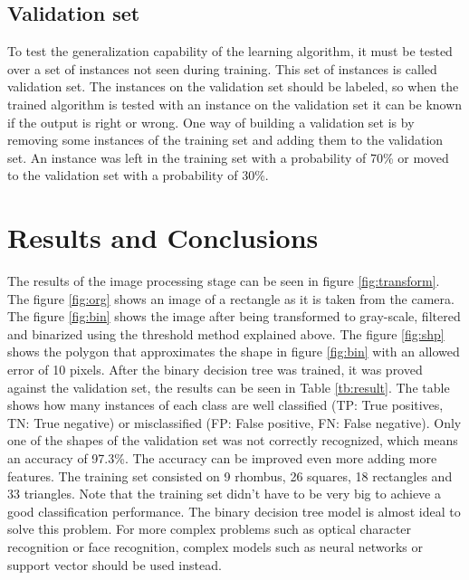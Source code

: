 \documentclass[10pt,journal]{IEEEtran}
\begin{document}
	\subsection{Validation set}
	To test the generalization capability of the learning algorithm, it must be
	tested over a set of instances not seen during training. This set of instances is
	called validation set. The instances on the validation set should be labeled, so when
	the trained algorithm is tested with an instance on the validation set it can be known if
	the output is right or wrong.\newline
	One way of building a validation set is by removing some instances of the training set
	and adding them to the validation set. An instance was left in the training set with a
	probability of 70\% or moved to the validation set with a probability of 30\%.
	
	\section{Results and Conclusions}
	The results of the image processing stage can be seen in figure \ref{fig:transform}. The
	figure \ref{fig:org} shows an image of a rectangle as it is taken from the camera. The 
	figure \ref{fig:bin} shows the image after being transformed to gray-scale, filtered and 
	binarized using	the threshold method explained above. The figure \ref{fig:shp} shows the
	polygon that approximates the shape in figure \ref{fig:bin} with an allowed error of 10
	pixels.\newline
	After the binary decision tree was trained, it was proved against the validation set,
	the results can be seen in Table \ref{tb:result}. The table shows how many instances
	of each class are well classified (TP: True positives, TN: True negative) or
	misclassified (FP: False positive, FN: False negative).
	Only one of the shapes of the validation set
	was not correctly recognized, which means an accuracy of 97.3\%. The accuracy can
	be improved even more adding more features. \newline
	The training set consisted on 9 rhombus, 26 squares, 18 rectangles and 33 triangles. Note
	that the training set didn't have to be very big to achieve a good classification performance.
	The binary decision tree model is almost ideal to solve this problem. For
	more complex problems such as optical character recognition or face recognition,
	complex models such as neural networks or support vector should be used instead.
	
\end{document}
